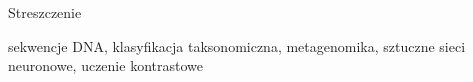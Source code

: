 \cleardoublepage{}

\abstract{}

Streszczenie

\keywords{}
sekwencje DNA, klasyfikacja taksonomiczna, metagenomika, sztuczne sieci neuronowe, uczenie kontrastowe
